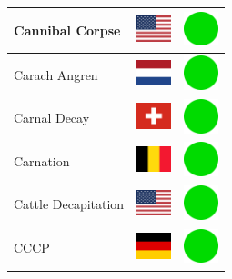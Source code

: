 \documentclass[12pt, a4paper, twoside]{report}
\begin{document}
\begin{center}
\begin{longtable}{|p{5cm}|p{2cm}|p{2cm}|}
			Cannibal Corpse & \includegraphics[width=1cm]{4x3/us} & \includegraphics[width=1cm]{likes/y} \\ \hline
			Carach Angren & \includegraphics[width=1cm]{4x3/nl} & \includegraphics[width=1cm]{likes/y} \\ \hline
			Carnal Decay & \includegraphics[width=1cm]{4x3/ch} & \includegraphics[width=1cm]{likes/y} \\ \hline
			Carnation & \includegraphics[width=1cm]{4x3/be} & \includegraphics[width=1cm]{likes/y} \\ \hline
			Cattle Decapitation & \includegraphics[width=1cm]{4x3/us} & \includegraphics[width=1cm]{likes/y} \\ \hline
			CCCP & \includegraphics[width=1cm]{4x3/de} & \includegraphics[width=1cm]{likes/y} \\ \hline

\end{longtable}
\end{center}
\end{document}
